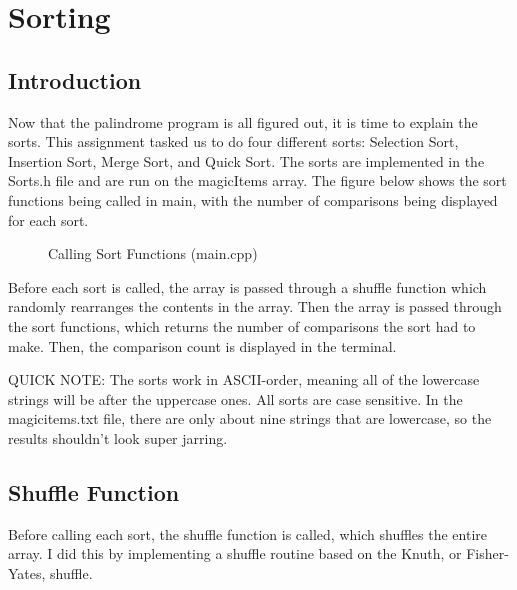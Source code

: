 \documentclass[letterpaper, 10pt]{article}
\begin{document}
\section{Sorting}
\setcounter{figure}{0} %
\subsection{Introduction}
\noindent
Now that the palindrome program is all figured out, it is time to explain the sorts. This assignment tasked us to do four different sorts: Selection Sort, Insertion Sort, Merge Sort, and Quick Sort. The sorts are implemented in the Sorts.h file and are run on the magicItems array. The figure below shows the sort functions being called in main, with the number of comparisons being displayed for each sort.
\begin{figure}[H]
  \centering
  
  \label{fig:figure4.1-part1}
\end{figure}

\begin{figure}[H]
  \centering
  
  \caption{Calling Sort Functions (main.cpp)}
  \label{fig:figure4.1-part2}
\end{figure}
\noindent
Before each sort is called, the array is passed through a shuffle function which randomly rearranges the contents in the array. Then the array is passed through the sort functions, which returns the number of comparisons the sort had to make. Then, the comparison count is displayed in the terminal.

\noindent
QUICK NOTE: The sorts work in ASCII-order, meaning all of the lowercase strings will be after the uppercase ones. All sorts are case sensitive. In the magicitems.txt file, there are only about nine strings that are lowercase, so the results shouldn't look super jarring.

\subsection{Shuffle Function}
\noindent
Before calling each sort, the shuffle function is called, which shuffles the entire array. I did this by implementing a shuffle routine based on the Knuth, or Fisher-Yates, shuffle.
\begin{figure}[H]
  \centering
  
  \label{fig:figure4.2-part1}
\end{figure}
\end{document}
